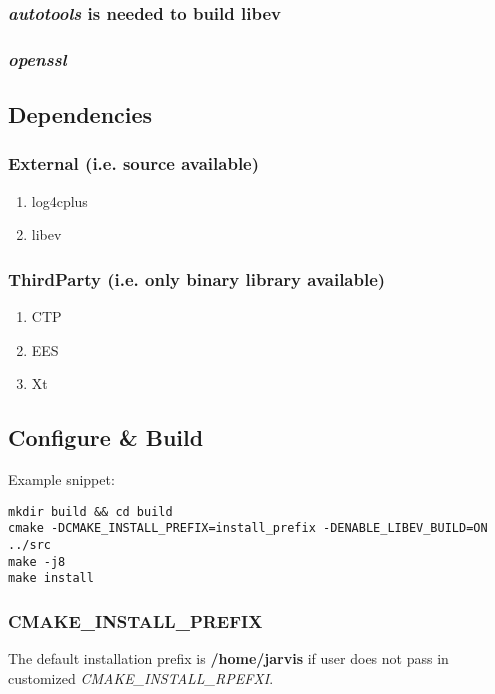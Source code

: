\documentclass[11pt]{article}
\begin{document}
\subsubsection{\emph{autotools} is needed to build libev}
\label{sec:org8fe2f4d}
\subsubsection{\emph{openssl}}
\label{sec:org888b899}

\subsection{Dependencies}
\label{sec:orgf151d03}
\subsubsection{External (i.e. source available)}
\label{sec:org56806c7}
\begin{enumerate}
\item log4cplus
\label{sec:org1947b1c}
\item libev
\label{sec:org5bdbca8}
\end{enumerate}
\subsubsection{ThirdParty (i.e. only binary library available)}
\label{sec:org19e84ff}
\begin{enumerate}
\item CTP
\label{sec:orgcee00c2}
\item EES
\label{sec:orga08fa43}
\item Xt
\label{sec:org3aed372}
\end{enumerate}

\subsection{Configure \& Build}
\label{sec:org6f03837}

Example snippet:
\begin{verbatim}
mkdir build && cd build
cmake -DCMAKE_INSTALL_PREFIX=install_prefix -DENABLE_LIBEV_BUILD=ON ../src
make -j8
make install
\end{verbatim}

\subsubsection{CMAKE\_INSTALL\_PREFIX}
\label{sec:org844251c}
The default installation prefix is \textbf{/home/jarvis} if user does not pass in customized \emph{CMAKE\_INSTALL\_RPEFXI}.
\end{document}
